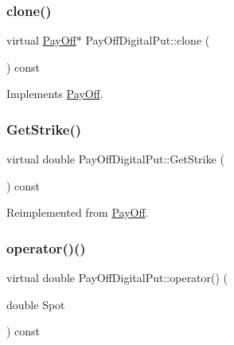 \subsubsection{\texorpdfstring{clone()}{clone()}}
{\footnotesize\ttfamily virtual \hyperlink{classPayOff}{Pay\+Off}$\ast$ Pay\+Off\+Digital\+Put\+::clone (\begin{DoxyParamCaption}{ }\end{DoxyParamCaption}) const\hspace{0.3cm}{\ttfamily [virtual]}}



Implements \hyperlink{classPayOff_ad8194d5b82247ae89c25c515f0ba806a}{Pay\+Off}.

\hypertarget{classPayOffDigitalPut_acd323410d45f6c99a532116f8fbfbc02}{}\label{classPayOffDigitalPut_acd323410d45f6c99a532116f8fbfbc02} 
\subsubsection{\texorpdfstring{Get\+Strike()}{GetStrike()}}
{\footnotesize\ttfamily virtual double Pay\+Off\+Digital\+Put\+::\+Get\+Strike (\begin{DoxyParamCaption}{ }\end{DoxyParamCaption}) const\hspace{0.3cm}{\ttfamily [virtual]}}



Reimplemented from \hyperlink{classPayOff_aa7a2451e286496c8d5a153000a818d34}{Pay\+Off}.

\hypertarget{classPayOffDigitalPut_a8b70e39ce33fdb23e78b593d08b623ce}{}\label{classPayOffDigitalPut_a8b70e39ce33fdb23e78b593d08b623ce} 
\subsubsection{\texorpdfstring{operator()()}{operator()()}}
{\footnotesize\ttfamily virtual double Pay\+Off\+Digital\+Put\+::operator() (\begin{DoxyParamCaption}\item[{double}]{Spot }\end{DoxyParamCaption}) const\hspace{0.3cm}{\ttfamily [virtual]}}



